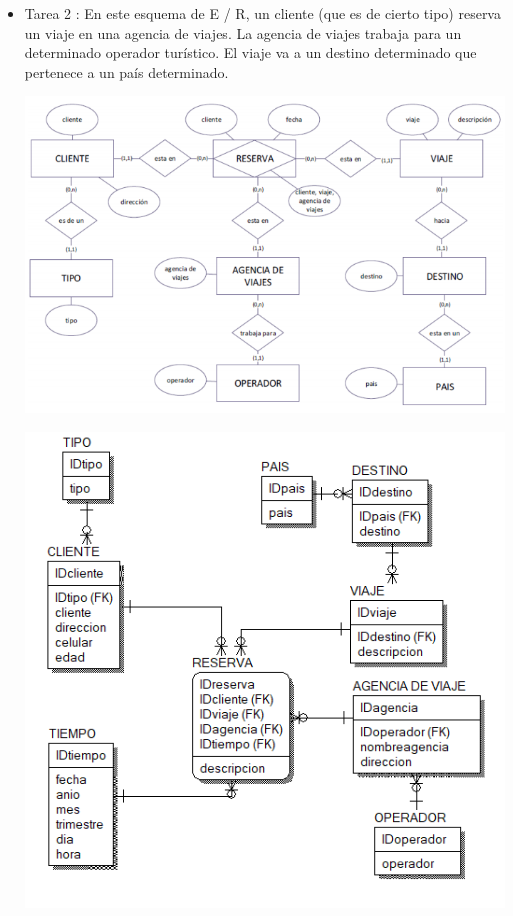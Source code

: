 \begin{itemize}
\item Tarea 2 :
En este esquema de E / R, un cliente (que es de cierto tipo) reserva un viaje en una agencia de viajes. La agencia de viajes
trabaja para un determinado operador turístico. El viaje va a un destino determinado que pertenece a un país determinado.

\begin{center}
\includegraphics[width=14cm]{./Imagenes/tarea2.png}
\end{center}
\begin{center}
\includegraphics[width=14cm]{./Imagenes/tarea22.png}
\end{center}



\end{itemize}
